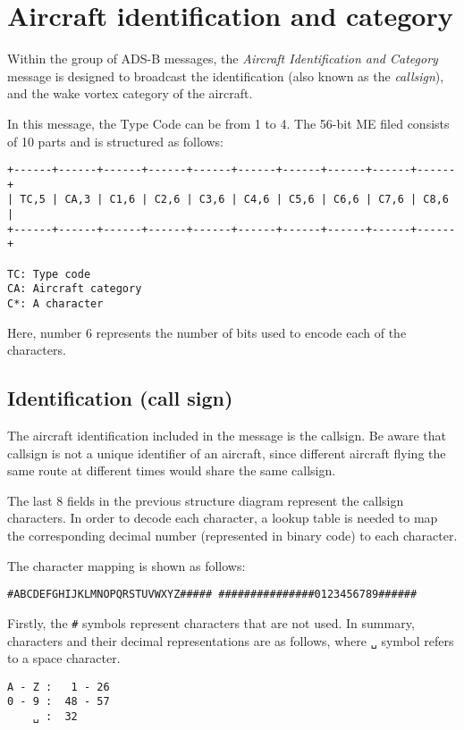 \chapter{Aircraft identification and category}

Within the group of ADS-B messages, the \emph{Aircraft Identification and Category} message is designed to broadcast the identification (also known as the \emph{callsign}), and the wake vortex category of the aircraft.

In this message, the Type Code can be from 1 to 4. The 56-bit ME filed consists of 10 parts and is structured as follows:

\begin{verbatim}
+------+------+------+------+------+------+------+------+------+------+
| TC,5 | CA,3 | C1,6 | C2,6 | C3,6 | C4,6 | C5,6 | C6,6 | C7,6 | C8,6 |
+------+------+------+------+------+------+------+------+------+------+

TC: Type code
CA: Aircraft category
C*: A character
\end{verbatim}

Here, number 6 represents the number of bits used to encode each of the characters.

\section{Identification (call sign)}
The aircraft identification included in the message is the callsign. Be aware that callsign is not a unique identifier of an aircraft, since different aircraft flying the same route at different times would share the same callsign.

The last 8 fields in the previous structure diagram represent the callsign characters. In order to decode each character, a lookup table is needed to map the corresponding decimal number (represented in binary code) to each character.

The character mapping is shown as follows:

\begin{verbatim}
#ABCDEFGHIJKLMNOPQRSTUVWXYZ##### ###############0123456789######
\end{verbatim}

Firstly, the \texttt{\#} symbols represent characters that are not used. In summary, characters and their decimal representations are as follows, where  \texttt{␣} symbol refers to a space character. 

\begin{verbatim}
A - Z :   1 - 26
0 - 9 :  48 - 57
    ␣ :  32
\end{verbatim}


